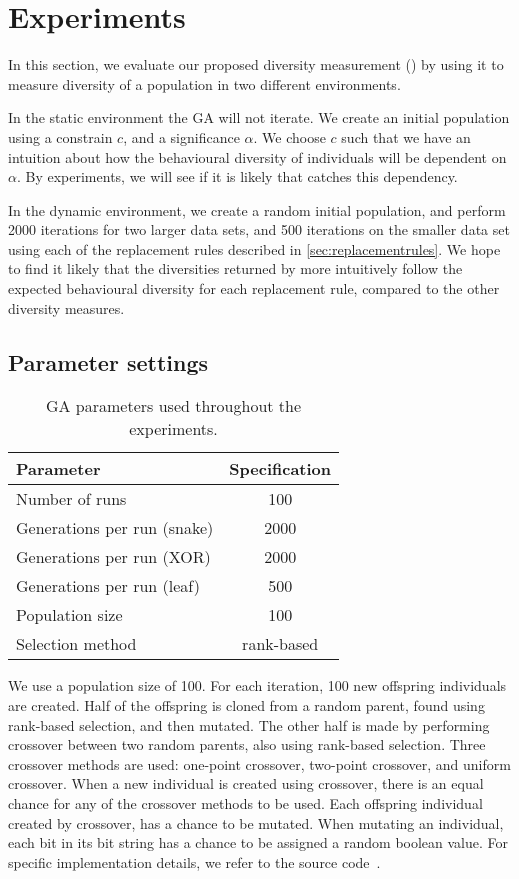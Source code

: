 \section{Experiments}
In this section, we evaluate our proposed diversity measurement (\dia) by using it to measure diversity of a population in two different environments.

In the static environment the GA will not iterate. We create an initial population using a constrain $c$, and a significance $\alpha$. We choose $c$ such that we have an intuition about how the behavioural diversity of individuals will be dependent on $\alpha$. By experiments, we will see if it is likely that \dia{} catches this dependency.

In the dynamic environment, we create a random initial population, and perform 2000 iterations for two larger data sets, and 500 iterations on the smaller data set using each of the  replacement rules described in \cref{sec:replacementrules}. We hope to find it likely that the diversities returned by \dia{} more intuitively follow the expected behavioural diversity for each replacement rule, compared to the other diversity measures.

\subsection{Parameter settings}

\begin{table}
  \centering
  \begin{tabular}{l S}
    \toprule
    Parameter & {Specification} \\
    \midrule
    Number of runs & 100 \\
    Generations per run (snake) & 2000 \\
    Generations per run (XOR) & 2000 \\
    Generations per run (leaf) & 500 \\
    Population size & 100 \\
    Selection method & {rank-based} \\
    \bottomrule
  \end{tabular}
  \caption{GA parameters used throughout the experiments.}
  \label{tab:gaparam}
\end{table}

We use a population size of 100. For each iteration, 100 new offspring individuals are created. Half of the offspring is cloned from a random parent, found using rank-based selection, and then mutated. The other half is made by performing crossover between two random parents, also using rank-based selection. Three crossover methods are used: one-point crossover, two-point crossover, and uniform crossover. When a new individual is created using crossover, there is an equal chance for any of the crossover methods to be used. Each offspring individual created by crossover, has a  chance to be mutated. When mutating an individual, each bit in its bit string has a  chance to be assigned a random boolean value. For specific implementation details, we refer to the source code~\cite{mbm:kmc:ekoGA}.

